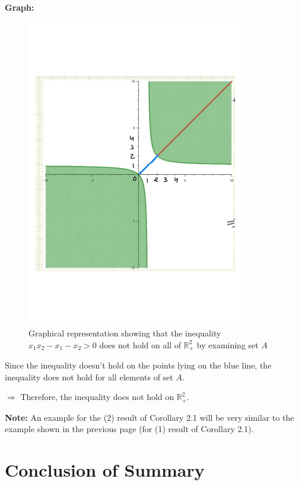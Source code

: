 \documentclass[12pt]{article}
\theoremstyle{definition}
\begin{document}
\textbf{Graph:}
\begin{figure}[h]
\centering
\includegraphics[width=0.85\textwidth]{corollary_graph.pdf}
\caption{Graphical representation showing that the inequality $x_1x_2 - x_1 - x_2 > 0$ does not hold on all of $\mathbb{R}_+^2$ by examining set $A$}
\label{fig:corollary21example}
\end{figure}

Since the inequality doesn't hold on the points lying on the blue line, the inequality does not hold for all elements of set $A$.

$\Rightarrow$ Therefore, the inequality does not hold on $\mathbb{R}_+^2$.

\vspace{1cm}

\textbf{Note:} An example for the (2) result of Corollary 2.1 will be very similar to the example shown in the previous page (for (1) result of Corollary 2.1).

\clearpage

\section{Conclusion of Summary}
\end{document}
